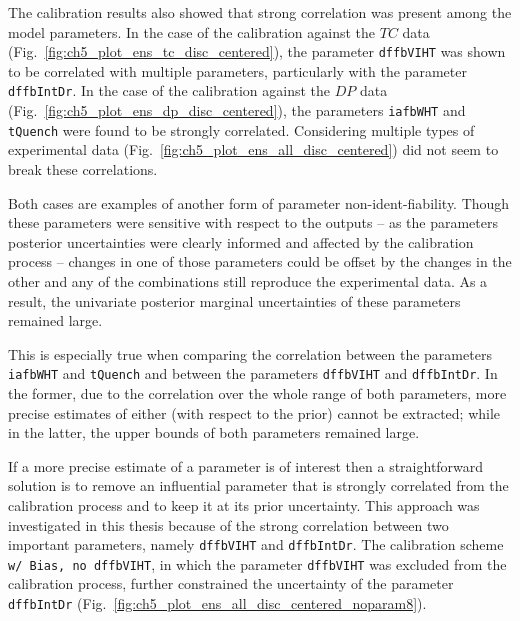 The calibration results also showed that strong correlation was pres\-ent among the model parameters.
In the case of the calibration against the $TC$ data (Fig.~\ref{fig:ch5_plot_ens_tc_disc_centered}), the parameter \texttt{dffbVIHT} was shown to be correlated with multiple parameters, particularly with the parameter \texttt{dffbIntDr}.
In the case of the calibration against the $DP$ data (Fig.~\ref{fig:ch5_plot_ens_dp_disc_centered}), the parameters \texttt{iafbWHT} and \texttt{tQuench} were found to be strongly correlated. 
Considering multiple types of experimental data (Fig.~\ref{fig:ch5_plot_ens_all_disc_centered}) did not seem to break these correlations.

Both cases are examples of another form of parameter non-ident-fiability.
Though these parameters were sensitive with respect to the outputs -- as the parameters posterior uncertainties were clearly informed and affected by the calibration process -- 
changes in one of those parameters could be offset by the changes in the other and any of the combinations still reproduce the experimental data. 
As a result, the univariate posterior marginal uncertainties of these parameters remained large.

This is especially true when comparing the correlation between the parameters \texttt{iafbWHT} and \texttt{tQuench} and between the parameters \texttt{dffbVIHT} and \texttt{dffbIntDr}. 
In the former, due to the correlation over the whole range of both parameters, more precise estimates of either (with respect to the prior) cannot be extracted;
while in the latter, the upper bounds of both parameters remained large.

If a more precise estimate of a parameter is of interest then a straightforward solution is to remove an influential parameter that is strongly correlated from the calibration process \cite{Brun2002} and to keep it at its prior uncertainty.
This approach was investigated in this thesis because of the strong correlation between two important parameters, namely \texttt{dffbVIHT} and \texttt{dffbIntDr}.
The calibration scheme \texttt{w/ Bias, no dffbVIHT}, in which the parameter \texttt{dffbVIHT} was excluded from the calibration process, further constrained the uncertainty of the parameter \texttt{dffbIntDr} (Fig.~\ref{fig:ch5_plot_ens_all_disc_centered_noparam8}).

